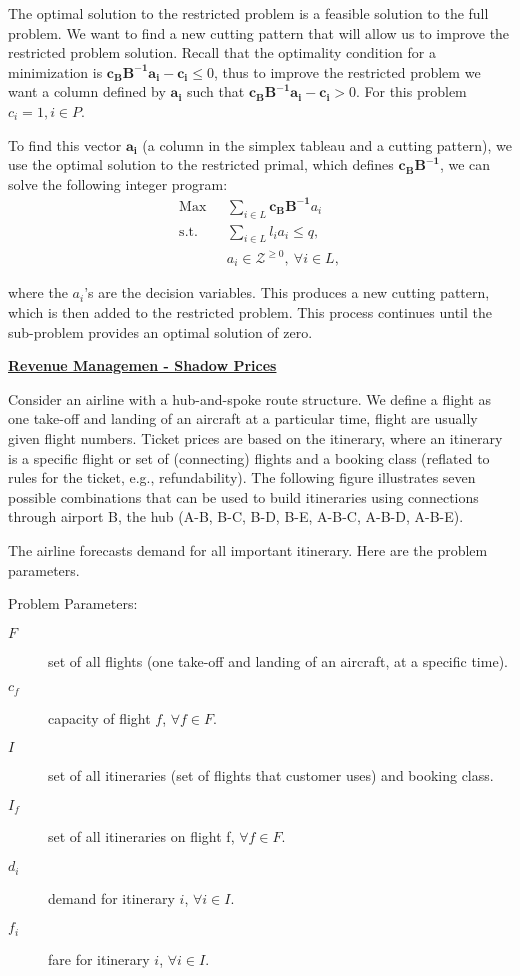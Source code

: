 The optimal solution to the restricted problem is a feasible solution to the full problem. We want to find a new cutting pattern that will allow us to improve the restricted problem solution. Recall that the optimality condition  for a minimization is $\mathbf{c_BB^{-1}a_i -c_i} \le 0$, thus to improve the restricted problem we want a column defined by $\mathbf{a_i}$ such that $\mathbf{c_BB^{-1}a_i -c_i} > 0$.  For this  problem $c_i = 1, i \in P$.  

To find this vector $\mathbf{a_i}$ (a column in the simplex tableau and a cutting pattern), we use the  optimal solution to the restricted primal, which defines $\mathbf{c_BB^{-1}}$, we can solve the following integer program:
\begin{align*}
\mbox{Max~~} & \sum_{i \in L} \mathbf{c_BB^{-1}}a_i \\
\mbox{s.t.~~} & \sum_{i \in L}l_i a_i \le q, \\
& a_i \in \mathcal{Z}^{\ge 0}, ~\forall i \in L,
\end{align*}

where the $a_i$'s are the decision variables.  This produces a new cutting pattern, which is then added to the restricted problem.  This process continues until the sub-problem provides an optimal solution of zero.


\underline{\bf Revenue Managemen - Shadow Prices}

Consider an airline with a hub-and-spoke route structure. We define a flight as one take-off and landing of an aircraft at a particular time, flight are usually given flight numbers.  Ticket prices are based on the itinerary, where an itinerary is a specific flight or set of (connecting) flights and a booking class (reflated to rules for the ticket, e.g., refundability). The following figure illustrates seven possible combinations that can be used to build itineraries using connections through airport B, the hub (A-B, B-C, B-D, B-E, A-B-C, A-B-D, A-B-E).

\begin{center}
\end{center}
The airline forecasts demand for all important itinerary. Here are the problem parameters.

\bigskip Problem Parameters: \\
\begin{description}
\item[$F$] set of all flights (one take-off and landing of an aircraft, at a specific time).
\item[$c_f$] capacity of flight $f$, $\forall f \in F$.
\item[$I$] set of all itineraries (set of flights that customer uses) and booking class.
\item[$I_f$] set of all itineraries on flight f, $\forall f \in F$.
\item[$d_i$ ] demand for itinerary $i$, $\forall i \in I$.
\item[$f_i$] fare for itinerary $i$, $\forall i \in I$.
\end{description}

